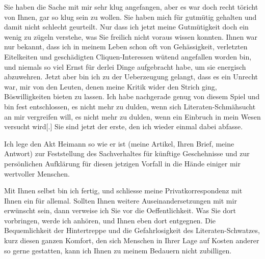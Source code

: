 \pstart
           Sie haben die Sache mit mir sehr klug angefangen, aber es war doch recht töricht von
               Ihnen, gar so klug sein zu wollen. Sie haben mich für gutmütig gehalten und damit
               nicht schlecht ge{\pb}urteilt. Nur
               dass ich jetzt meine Gutmütigkeit doch ein wenig zu zügeln verstehe, was Sie freilich
               nicht voraus wissen konnten. Ihnen war nur bekannt, dass ich in meinem Leben schon
               oft von Gehässigkeit, verletzten Eitelkeiten und geschädigten Cliquen-Interessen
               wütend angefallen worden bin, und niemals so viel Ernst für derlei Dinge aufgebracht
               habe, um sie energisch abzuwehren. Jetzt aber bin ich zu der Ueberzeugung gelangt,
               dass es ein Unrecht war, mir von den Leuten, denen meine Kritik wider den Strich
               ging, Böswilligkeiten bieten zu lassen. Ich habe nachgerade genug von diesem Spiel
               und bin fest entschlossen, es nicht mehr zu dulden, wenn sich Literaten-Schmähsucht
               an mir vergreifen will, es nicht mehr zu dulden, wenn ein Einbruch in mein Wesen
               versucht wird{[}.{]} Sie sind jetzt der erste, den ich wieder einmal
               dabei abfasse.\pend
           
\pstart
           Ich lege den Akt Heimann so wie er ist (meine
                  Artikel, Ihren
               Brief, meine Antwort) zur Feststellung des Sachverhaltes für künftige Geschehnisse
               und zur persönlichen Aufklärung für diesen jetzigen Vorfall in die Hände einiger mir
               wertvoller Menschen.\pend
           
\pstart
           Mit Ihnen selbst bin ich fertig, und schliesse meine Privatkorrespondenz mit Ihnen
               ein für allemal. Sollten Ihnen weitere Auseinandersetzungen mit mir erwünscht sein,
               dann verweise ich Sie vor die Oeffentlichkeit. Was Sie dort vorbringen, werde ich
               anhören, und Ihnen eben dort entgegnen. Die Bequemlichkeit der Hintertreppe und die
               Gefahrlosigkeit des Literaten-Schwatzes, kurz diesen ganzen Komfort, den sich
               Menschen in Ihrer Lage auf Kosten anderer so gerne gestatten, kann ich Ihnen zu
               meinem Bedauern nicht zubilligen.\pend
           \endnumbering{}  
      